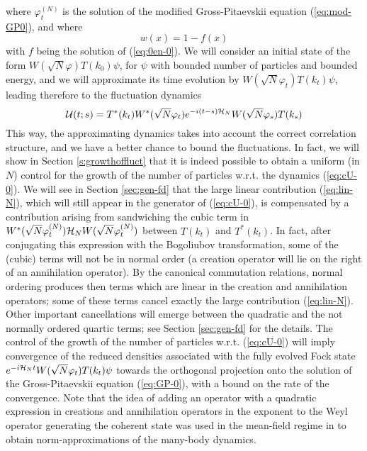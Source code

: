 \documentclass[11pt,a4paper]{article}
\newcommand{\cU}{{\cal U}}
\newcommand{\cH}{{\cal H}}
\begin{document}
where $\varphi^{(N)}_t$ is the solution of the modified Gross-Pitaevskii equation (\ref{eq:mod-GP0}), and where
\[ w (x) = 1 - f(x) \]
with $f$ being the solution of (\ref{eq:0en-0}). We will consider an initial state of the form $W(\sqrt{N} \varphi) T(k_0) \psi$, for $\psi$ with bounded number of particles and bounded energy, and we will approximate its time evolution by $W(\sqrt{N} \varphi_t) T(k_t) \psi$, leading therefore to the fluctuation dynamics 
\begin{equation}\label{eq:cU-0} \cU (t;s) = T^* (k_t) W^* (\sqrt{N} \varphi_t) e^{-i(t-s) \cH_N} W(\sqrt{N} \varphi_s) T(k_s) \end{equation}
This way, the approximating dynamics takes into account the correct correlation structure, and we have a better chance to bound the fluctuations. In fact, we will show in Section \ref{s:growthoffluct} that it is indeed possible to obtain a uniform (in $N$) control for the growth of the number of particles w.r.t. the dynamics (\ref{eq:cU-0}). We will see in Section \ref{sec:gen-fd} that the large linear contribution (\ref{eq:lin-N}), which will still appear in the generator of (\ref{eq:cU-0}), is compensated by a contribution arising from sandwiching the cubic term in $W^* (\sqrt{N} \varphi_t^{(N)}) \cH_N W(\sqrt{N} \varphi_t^{(N)})$ between $T(k_t)$ and $T^* (k_t)$. In fact, after conjugating this expression with the Bogoliubov transformation, some of the (cubic) terms will not be in normal order (a creation operator will lie on the right of an annihilation operator). By the canonical commutation relations, normal ordering produces then terms which are linear in the creation and annihilation operators; some of these terms cancel exactly the large contribution (\ref{eq:lin-N}). Other important cancellations will emerge between the quadratic and the not normally ordered quartic terms; see Section \ref{sec:gen-fd} for the details. The control of the growth of the number of particles w.r.t. (\ref{eq:cU-0}) will imply convergence of the reduced densities associated with the fully evolved Fock state $e^{-i \cH_N t} W(\sqrt{N} \varphi_t) T(k_t) \psi$ towards the orthogonal projection onto the solution of the Gross-Pitaevskii equation (\ref{eq:GP-0}), with a bound on the rate of the convergence. Note that the idea of adding an operator with a quadratic expression in creations and annihilation operators in the exponent to the Weyl operator generating the coherent state was used in the mean-field regime in \cite{GMM2010} to obtain norm-approximations of the many-body dynamics. 
\end{document}

